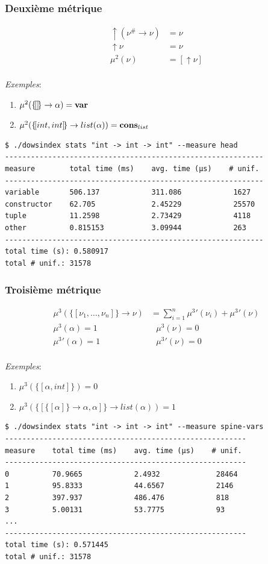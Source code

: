 \documentclass[serif]{beamer}
\newcommand{\exemples}{\textit{Exemples}\xspace}
\newcommand{\mset}[1]{\{\![#1]\!\}}
\begin{document}
\begin{frame}[fragile=singleslide]\frametitle{Deuxième métrique}
\scriptsize
\begin{align*}
		\uparrow (\nu^\# \rightarrow \nu) &=
		\nu
	\\
		\uparrow \nu &=
		\nu
	\\
		\mu^2 (\nu) &=
		[ \uparrow \nu ]
\end{align*}
\\
\exemples :
\begin{enumerate}
	\item $\mu^2 (\mset{} \rightarrow \alpha) = \bold{var}$
	\item $\mu^2 (\mset{int, int} \rightarrow list (\alpha)) = \bold{cons}_{list}$
\end{enumerate}
\bigskip
\begin{verbatim}
$ ./dowsindex stats "int -> int -> int" --measure head
------------------------------------------------------------
measure        total time (ms)    avg. time (µs)    # unif.
------------------------------------------------------------
variable       506.137            311.086            1627
constructor    62.705             2.45229            25570
tuple          11.2598            2.73429            4118
other          0.815153           3.09944            263
------------------------------------------------------------
total time (s): 0.580917
total # unif.: 31578
\end{verbatim}
\end{frame}


\begin{frame}[fragile=singleslide]\frametitle{Troisième métrique}
\scriptsize
\begin{align*}
		\mu^3 (\mset{\nu_1, \dots, \nu_n} \rightarrow \nu) &=
		\sum_{i=1}^n {\mu^3}' (\nu_i) + {\mu^3}' (\nu)
	\\
		\mu^3 (\alpha) = 1 &\ \ \ 
		\mu^3 (\nu) = 0
	\\
		{\mu^3}' (\alpha) = 1 &\ \ \ 
		{\mu^3}' (\nu) = 0
\end{align*}
\\
\exemples :
\begin{enumerate}
	\item $\mu^3 (\mset{\alpha, int}) = 0$
	\item $\mu^3 (\mset{\mset{\alpha} \rightarrow \alpha, \alpha} \rightarrow list (\alpha)) = 1$
\end{enumerate}
\bigskip
\begin{verbatim}
$ ./dowsindex stats "int -> int -> int" --measure spine-vars
--------------------------------------------------------
measure    total time (ms)    avg. time (µs)    # unif.
--------------------------------------------------------
0          70.9665            2.4932             28464
1          95.8333            44.6567            2146
2          397.937            486.476            818
3          5.00131            53.7775            93
...
--------------------------------------------------------
total time (s): 0.571445
total # unif.: 31578
\end{verbatim}
\end{frame}
\end{document}
